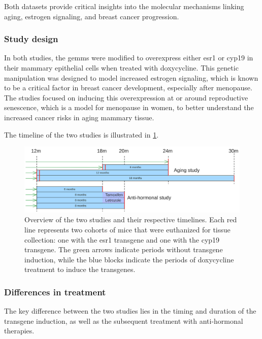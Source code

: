 Both datasets provide critical insights into the molecular mechanisms linking
aging, estrogen signaling, and breast cancer progression.

\subsubsection{Study design}

In both studies, the \glspl{gemm} were modified to overexpress either
\gls{esr1} or \gls{cyp19} in their mammary epithelial cells when treated with
doxycycline.
This genetic manipulation was designed to model increased estrogen signaling,
which is known to be a critical factor in breast cancer development, especially
after menopause\supercite{furth_esr1_2023,furth_overexpression_2023}.
The studies focused on inducing this overexpression at or around reproductive
senescence, which is a model for menopause in women, to better understand the
increased cancer risks in aging mammary
tissue\supercite{furth_esr1_2023,furth_overexpression_2023}.

The timeline of the two studies is illustrated in \cref{fig:dataset_timeline}.

\begin{figure}[ht]
    \centering

    \includegraphics[width=\textwidth]{chapters/3_materials_and_methods/figures/datasets.png}
    \caption{Overview of the two studies and their respective timelines.
        Each red line represents two cohorts of mice that were euthanized for tissue
        collection: one with the \gls{esr1} transgene and one with the \gls{cyp19}
        transgene.
        The green arrows indicate periods without transgene induction, while the blue
        blocks indicate the periods of doxycycline treatment to induce the transgenes.
    } \label{fig:dataset_timeline} \end{figure}

\subsubsection{Differences in treatment}
The key difference between the two studies lies in the timing and duration of
the transgene induction, as well as the subsequent treatment with anti-hormonal
therapies.

